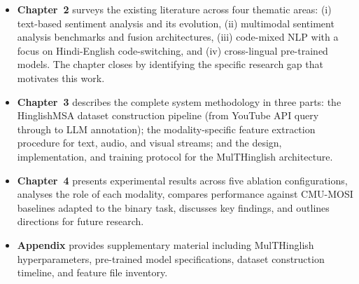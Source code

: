 \begin{itemize}
    \item \textbf{Chapter~2} surveys the existing literature across four thematic areas: (i) text-based sentiment analysis and its evolution, (ii) multimodal sentiment analysis benchmarks and fusion architectures, (iii) code-mixed NLP with a focus on Hindi-English code-switching, and (iv) cross-lingual pre-trained models. The chapter closes by identifying the specific research gap that motivates this work.

    \item \textbf{Chapter~3} describes the complete system methodology in three parts: the HinglishMSA dataset construction pipeline (from YouTube API query through to LLM annotation); the modality-specific feature extraction procedure for text, audio, and visual streams; and the design, implementation, and training protocol for the MulTHinglish architecture.

    \item \textbf{Chapter~4} presents experimental results across five ablation configurations, analyses the role of each modality, compares performance against CMU-MOSI baselines adapted to the binary task, discusses key findings, and outlines directions for future research.

    \item \textbf{Appendix} provides supplementary material including MulTHinglish hyperparameters, pre-trained model specifications, dataset construction timeline, and feature file inventory.
\end{itemize}

\newpage